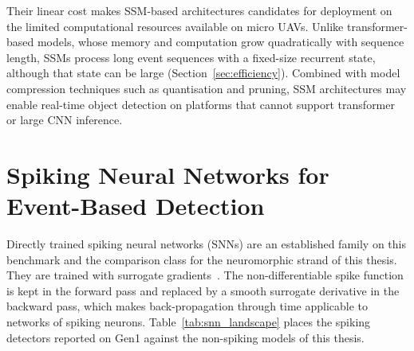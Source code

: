 \documentclass[11pt, a4paper]{report}
\begin{document}
Their linear cost makes SSM-based architectures candidates for deployment on the limited computational resources available on micro UAVs. Unlike transformer-based models, whose memory and computation grow quadratically with sequence length, SSMs process long event sequences with a fixed-size recurrent state, although that state can be large (Section~\ref{sec:efficiency}). Combined with model compression techniques such as quantisation and pruning, SSM architectures may enable real-time object detection on platforms that cannot support transformer or large CNN inference.

\section{Spiking Neural Networks for Event-Based Detection}
\label{sec:snn_detection}
Directly trained spiking neural networks (SNNs) are an established family on this benchmark and the
comparison class for the neuromorphic strand of this thesis. They are trained with surrogate
gradients~\cite{neftci2019surrogate}. The non-differentiable spike function is kept in the forward pass
and replaced by a smooth surrogate derivative in the backward pass, which makes back-propagation through
time applicable to networks of spiking neurons. Table~\ref{tab:snn_landscape} places the spiking detectors
reported on Gen1 against the non-spiking models of this thesis.
\end{document}
